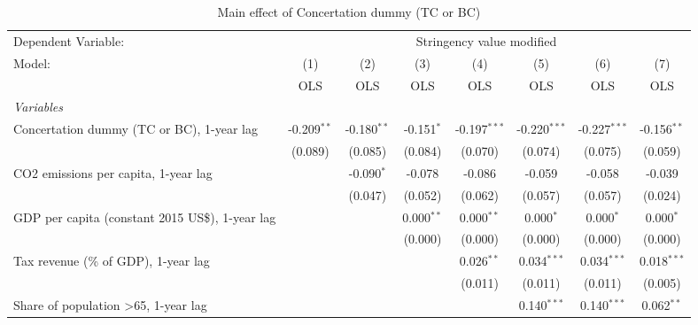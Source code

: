
\begin{table}[htbp]
   \caption{Main effect of Concertation dummy (TC or BC)}
   \centering
   \begin{tabular}{lccccccc}
      \toprule
      Dependent Variable: & \multicolumn{7}{c}{Stringency value modified}\\
      Model:                                                & (1)           & (2)           & (3)          & (4)            & (5)            & (6)            & (7)\\  
                                                            &  OLS          & OLS           & OLS          & OLS            & OLS            & OLS            & OLS\\  
      \midrule
      \emph{Variables}\\
      Concertation dummy (TC or BC), 1-year lag             & -0.209$^{**}$ & -0.180$^{**}$ & -0.151$^{*}$ & -0.197$^{***}$ & -0.220$^{***}$ & -0.227$^{***}$ & -0.156$^{**}$\\   
                                                            & (0.089)       & (0.085)       & (0.084)      & (0.070)        & (0.074)        & (0.075)        & (0.059)\\   
      CO2 emissions per capita, 1-year lag                  &               & -0.090$^{*}$  & -0.078       & -0.086         & -0.059         & -0.058         & -0.039\\   
                                                            &               & (0.047)       & (0.052)      & (0.062)        & (0.057)        & (0.057)        & (0.024)\\   
      GDP per capita (constant 2015 US\$), 1-year lag       &               &               & 0.000$^{**}$ & 0.000$^{**}$   & 0.000$^{*}$    & 0.000$^{*}$    & 0.000$^{*}$\\   
                                                            &               &               & (0.000)      & (0.000)        & (0.000)        & (0.000)        & (0.000)\\   
      Tax revenue (\% of GDP), 1-year lag                   &               &               &              & 0.026$^{**}$   & 0.034$^{***}$  & 0.034$^{***}$  & 0.018$^{***}$\\   
                                                            &               &               &              & (0.011)        & (0.011)        & (0.011)        & (0.005)\\   
      Share of population >65, 1-year lag                   &               &               &              &                & 0.140$^{***}$  & 0.140$^{***}$  & 0.062$^{**}$\\   

\end{tabular}
\end{table}
